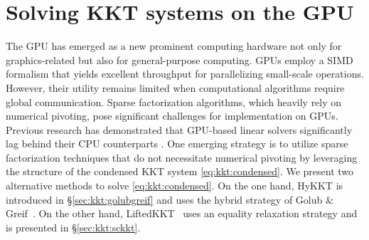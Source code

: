 \section{Solving KKT systems on the GPU}
The GPU has emerged as a new prominent computing hardware not only for graphics-related but also for general-purpose computing.
GPUs employ a SIMD formalism that yields excellent throughput for parallelizing small-scale operations.
However, their utility remains limited when computational algorithms require global communication.
Sparse factorization algorithms, which heavily rely on numerical pivoting, pose significant challenges for implementation on GPUs. Previous research has demonstrated that GPU-based linear solvers significantly lag behind their CPU counterparts \cite{swirydowicz2021linear,tasseff2019exploring}.
One emerging strategy is to utilize sparse factorization techniques that do not necessitate numerical pivoting \cite{regev2023hykkt,shin2023accelerating}
by leveraging the structure of the condensed KKT system \eqref{eq:kkt:condensed}.
We present two alternative methods to solve \eqref{eq:kkt:condensed}.
On the one hand, HyKKT is introduced in \S\ref{sec:kkt:golubgreif} and uses the hybrid
strategy of Golub \& Greif~\cite{golub2003solving,regev2023hykkt}.
On the other hand, LiftedKKT~\cite{shin2023accelerating} uses an equality relaxation strategy and
is presented in \S\ref{sec:kkt:sckkt}.

